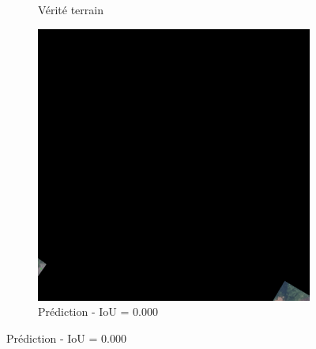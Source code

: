 \begin{figure}[H]
\begin{subfigure}{0.32\textwidth}
    \caption{Vérité terrain}
\end{subfigure}
\hfill
\begin{subfigure}{0.32\textwidth}
    \includegraphics[width=\textwidth]{02-main//figures/ch4/kfold_ensembles/segformer_tu-mambaout_base/worst_cases/worst_4_iou0.000_25001112_tile_9_1_991a94_overlay_pred.png}
    \caption{Prédiction - IoU = 0.000}
\end{subfigure}

\vspace{0.35cm}


\end{figure}

